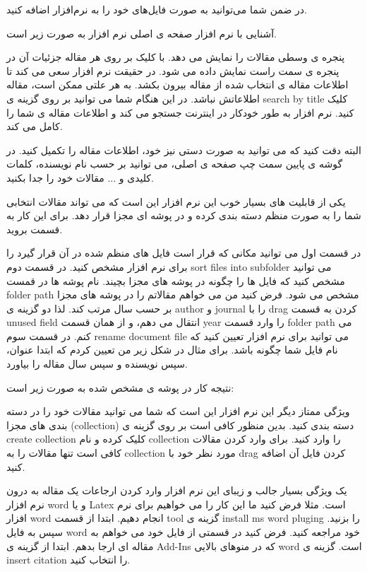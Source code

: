 در ضمن شما می‌توانید به صورت  فایل‌های خود را به نرم‌افزار اضافه کنید. 


آشنایی با نرم افزار
صفحه ی اصلی نرم افزار به صورت زیر است.



پنجره ی وسطی مقالات را نمایش می دهد. با کلیک بر روی هر مقاله جزئیات آن در پنجره ی سمت راست نمایش داده می شود. در حقیقت نرم افزار سعی می کند تا اطلاعات مقاله ی انتخاب شده از مقاله بیرون بکشد. به هر علتی ممکن است، مقاله اطلاعاتش نباشد. در این هنگام شما می توانید بر روی گزینه ی search by title  کلیک کنید. نرم افزار به طور خودکار در اینترنت جستجو می کند و اطلاعات مقاله ی شما را کامل می کند.

البته دقت کنید که می توانید به صورت دستی نیز خود،  اطلاعات مقاله را تکمیل کنید. 
در گوشه ی پایین سمت چپ صفحه ی اصلی، می توانید بر حسب نام نویسنده، کلمات کلیدی و ... مقالات خود را جدا بکنید. 

یکی از قابلیت های بسیار خوب این نرم افزار این است که می تواند مقالات انتخابی شما را به صورت منظم دسته بندی کرده و در پوشه ای مجزا قرار دهد. برای این کار به قسمت  بروید.


در قسمت اول می توانید مکانی که قرار است فایل های منظم شده در آن قرار گیرد را برای نرم افزار مشخص کنید. در قسمت دوم sort files into subfolder می توانید مشخص کنید که فایل ها را چگونه در پوشه های مجزا بچیند. نام پوشه ها در قمست folder path مشخص می شود. فرض کنید من می خواهم مقالاتم را در پوشه های مجزا بر حسب سال مرتب کند. لذا دو گزینه ی author  و journal را با drag کردن به قسمت unused field انتقال می دهم، و از همان قسمت year را وارد قسمت folder path می کنم. 
در قسمت سوم rename document file می توانید  برای نرم افزار تعیین کنید که نام فایل شما چگونه باشد. برای مثال در شکل زیر من تعیین کردم که ابتدا عنوان، سپس نویسنده و سپس سال مقاله را بیاورد. 

نتیجه کار در پوشه ی مشخص شده به صورت زیر است:


ویژگی ممتاز دیگر این نرم افزار این است که شما می توانید مقالات خود را در دسته بندی های مجزا (collection) دسته بندی کنید. بدین منظور کافی است بر روی گزینه ی create collection کلیک کرده و نام collection را وارد کنید. برای وارد کردن مقالات کافی است تنها مقالات را به collection مورد نظر خود با drag کردن فایل آن اضافه کنید.


یک ویژگی بسیار جالب و زیبای این نرم افزار وارد کردن ارجاعات یک مقاله به درون نرم افزار word و یا Latex است. مثلا فرض کنید ما این کار را می خواهیم برای نرم افزار word انجام دهیم. ابتدا از قسمت tool گزینه ی install ms word pluging را بزنید. سپس به فایل word خود مراجعه کنید. 
فرض کنید در قسمتی از فایل خود می خواهم به مقاله ای ارجا بدهم. ابتدا از گزینه ی Add-Ins که در منوهای بالایی word است. گزینه ی insert citation را انتخاب کنید. 

